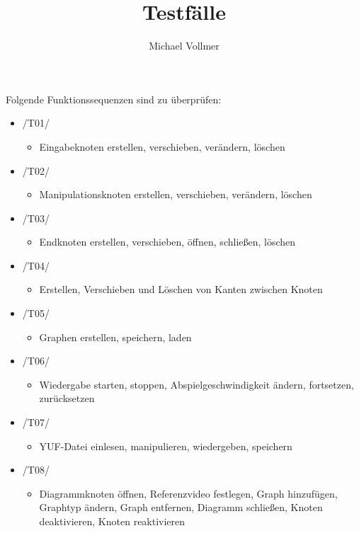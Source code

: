 \documentclass{article}
\begin{document}
\title{Testfälle}
\author{Michael Vollmer}
\maketitle

Folgende Funktionssequenzen sind zu überprüfen:
\begin{itemize}
	\item /T01/
		\begin{itemize}
			\item Eingabeknoten erstellen, verschieben, verändern, löschen
		\end{itemize}
	\item /T02/
		\begin{itemize}
			\item Manipulationsknoten erstellen, verschieben, verändern, löschen
		\end{itemize}
	\item /T03/
		\begin{itemize}
			\item Endknoten erstellen, verschieben, öffnen, schließen, löschen
		\end{itemize}
	\item /T04/
		\begin{itemize}
			\item Erstellen, Verschieben und Löschen von Kanten zwischen Knoten
		\end{itemize}
	\item /T05/
		\begin{itemize}
			\item Graphen erstellen, speichern, laden
		\end{itemize}
	\item /T06/
		\begin{itemize}
			\item Wiedergabe starten, stoppen, Abspielgeschwindigkeit ändern, fortsetzen, zurücksetzen
		\end{itemize}
	\item /T07/
		\begin{itemize}
			\item YUF-Datei einlesen, manipulieren, wiedergeben, speichern
		\end{itemize}
	\item /T08/
		\begin{itemize}
			\item Diagrammknoten öffnen, Referenzvideo festlegen, Graph hinzufügen, Graphtyp ändern, Graph entfernen, Diagramm schließen, Knoten deaktivieren, Knoten 
			reaktivieren
		\end{itemize}
\end{itemize}
\end{document}
